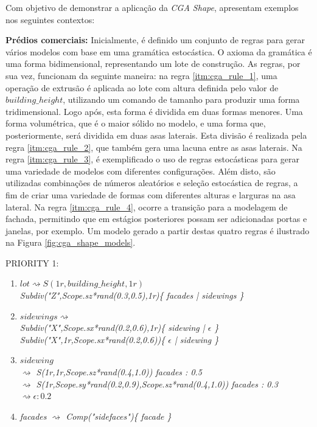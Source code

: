 Com objetivo de demonstrar a aplicação da \textit{CGA Shape},  apresentam exemplos nos seguintes contextos:

\textbf{Prédios comerciais:} Inicialmente, é definido um conjunto de regras para gerar vários modelos com base em uma gramática estocástica. O axioma da gramática é uma forma bidimensional, representando um lote de construção. As regras, por sua vez, funcionam da seguinte maneira: na regra \ref{itm:cga_rule_1}, uma operação de extrusão é aplicada ao lote com altura definida pelo valor de $building\_height$, utilizando um comando de tamanho para produzir uma forma tridimensional. Logo após, esta forma é dividida em duas formas menores. Uma forma volumétrica, que é o maior sólido no modelo, e uma forma que, posteriormente, será dividida em duas asas laterais. Esta divisão é realizada pela regra \ref{itm:cga_rule_2}, que também gera uma lacuna entre as asas laterais. Na regra \ref{itm:cga_rule_3}, é exemplificado o uso de regras estocásticas para gerar uma variedade de modelos com diferentes configurações. Além disto, são utilizadas combinações de números aleatórios e seleção estocástica de regras, a fim de criar uma variedade de formas com diferentes alturas e larguras na asa lateral. Na regra \ref{itm:cga_rule_4}, ocorre a transição para a modelagem de fachada, permitindo que em estágios posteriores possam ser adicionadas portas e janelas, por exemplo. Um modelo gerado a partir destas quatro regras é ilustrado na Figura \ref{fig:cga_shape_models}.

\newpage

\noindent \hspace{0.5cm} PRIORITY 1:

\begin{enumerate}
    \item \label{itm:cga_rule_1} $lot \rightsquigarrow S(1r,building\_height,1r)$ \\
        \qquad \qquad \textit{Subdiv("Z",Scope.sz*rand(0.3,0.5),1r)\{ facades | sidewings \}}
    \item \label{itm:cga_rule_2} $sidewings \rightsquigarrow $ \\
        \qquad \qquad \textit{Subdiv("X",Scope.sx*rand(0.2,0.6),1r)\{ sidewing | $\epsilon$ \}} \\
        \qquad \qquad \textit{Subdiv("X",1r,Scope.sx*rand(0.2,0.6))\{ $\epsilon$ | sidewing \}}
    \item \label{itm:cga_rule_3} $sidewing$ \\
        \qquad \qquad \textit{$\rightsquigarrow$ S(1r,1r,Scope.sz*rand(0.4,1.0)) facades : 0.5} \\
        \qquad \qquad \textit{$\rightsquigarrow$ S(1r,Scope.sy*rand(0.2,0.9),Scope.sz*rand(0.4,1.0))
    facades : 0.3} \\
        \qquad \qquad$ \rightsquigarrow \epsilon : 0.2$
    \item \label{itm:cga_rule_4} \textit{facades $\rightsquigarrow$ Comp("sidefaces")\{ facade \}}
\end{enumerate}

